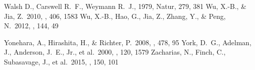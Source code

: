\documentclass[manuscript]{aastex}
\begin{document}
\begin{thebibliography}{}
 Walsh D., Carswell R.~F., Weymann R.~J., 1979, Natur, 279, 381 
 Wu, X.-B., \& Jia, Z.\ 2010, \mnras, 406, 1583 
 Wu, X.-B., Hao, G., Jia, Z., Zhang, Y., \& Peng, N.\ 2012, \aj, 144, 49 

 Yonehara, A., Hirashita, H., \& Richter, P.\ 2008, \aap, 478, 95
 York, D.~G., Adelman, J., Anderson, J.~E., Jr., et al.\ 2000, \aj, 120, 1579 
 Zacharias, N., Finch, C., Subasavage, J., et al.\ 2015, \aj, 150, 101 

\clearpage



\end{thebibliography}


\end{document}
